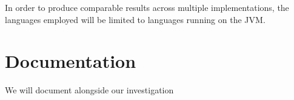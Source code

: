 In order to produce comparable results across multiple implementations, the languages employed will be limited to languages running on the \ac{JVM}.

\section{Documentation}
We will document alongside our investigation

\worksheetend
